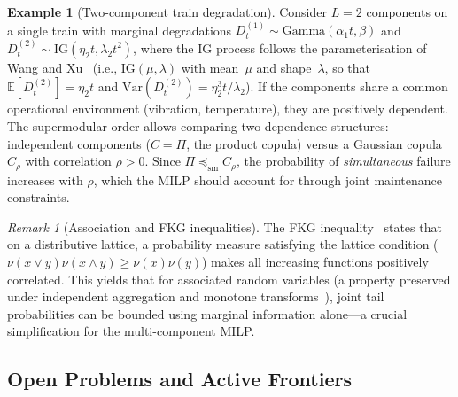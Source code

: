\documentclass[11pt,a4paper]{article}
\theoremstyle{plain}
\theoremstyle{definition}
\newtheorem{example}[theorem]{Example}
\theoremstyle{remark}
\newtheorem{remark}[theorem]{Remark}
\begin{document}

\begin{example}[Two-component train degradation]
\label{ex:two_component}
Consider $L = 2$ components on a single train with marginal degradations
$D^{(1)}_t \sim \mathrm{Gamma}(\alpha_1 t, \beta)$ and
$D^{(2)}_t \sim \mathrm{IG}(\eta_2 t, \lambda_2 t^2)$, where the IG process
follows the parameterisation of Wang and Xu~\cite{wang2010} (i.e.,
$\mathrm{IG}(\mu, \lambda)$ with mean~$\mu$ and shape~$\lambda$, so that
$\mathbb{E}[D^{(2)}_t] = \eta_2 t$ and
$\mathrm{Var}(D^{(2)}_t) = \eta_2^3 t / \lambda_2$).
If the components share a common operational environment (vibration, temperature),
they are positively dependent.  The supermodular order allows comparing two
dependence structures: independent components
($C = \Pi$, the product copula) versus a Gaussian copula $C_\rho$ with
correlation $\rho > 0$.  Since $\Pi \preceq_{\mathrm{sm}} C_\rho$, the probability
of \emph{simultaneous} failure increases with $\rho$, which the MILP should account
for through joint maintenance constraints.
\end{example}

\begin{remark}[Association and FKG inequalities]
The FKG inequality~\cite{fkg1971} states that on a distributive
lattice, a probability measure satisfying the lattice condition
($\nu(x \vee y)\nu(x \wedge y) \geq \nu(x)\nu(y)$) makes all increasing functions
positively correlated.  This yields that for associated random variables (a property
preserved under independent aggregation and monotone transforms~\cite{esary1967}),
joint tail probabilities can be bounded using marginal information alone---a crucial
simplification for the multi-component MILP.
\end{remark}

\subsection{Open Problems and Active Frontiers}
\label{sec:micro:open}
\end{document}
